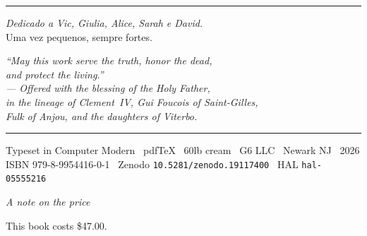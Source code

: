 \documentclass[12pt, oneside]{book}
\theoremstyle{plain}
\theoremstyle{definition}
\theoremstyle{remark}
\begin{document}
\vspace{0.4cm}

\begin{center}
\rule{0.5\textwidth}{0.4pt}

\vspace{0.4cm}

\textit{Dedicado a Vic, Giulia, Alice, Sarah e David.}\\[0.3em]
{\small Uma vez pequenos, sempre fortes.}

\vspace{0.5cm}

\begin{center}
{\small\itshape
\textit{``May this work serve the truth, honor the dead,}\\
\textit{and protect the living.''}\\[0.4em]
{\scriptsize\color{gray} --- Offered with the blessing of the Holy Father,\\
in the lineage of Clement~IV, Gui Foucois of Saint-Gilles,\\
Fulk of Anjou, and the daughters of Viterbo.}
}
\end{center}

\vspace{0.4cm}

\rule{0.5\textwidth}{0.2pt}

\vspace{0.3cm}

{\scriptsize\color{gray}
Typeset in Computer Modern \textperiodcentered\ pdfTeX \textperiodcentered\
60lb cream \textperiodcentered\ G6 LLC \textperiodcentered\ Newark NJ \textperiodcentered\ 2026\\
ISBN 979-8-9954416-0-1 \textperiodcentered\ Zenodo \texttt{10.5281/zenodo.19117400}
\textperiodcentered\ HAL \texttt{hal-05555216}}
\end{center}

\backmatter


\newpage
\thispagestyle{empty}
\vspace*{3.5cm}

\begin{center}
{\large\textit{A note on the price}}
\end{center}

\vspace{0.8cm}

\noindent This book costs \$47.00.

\vspace{0.4cm}
\end{document}
